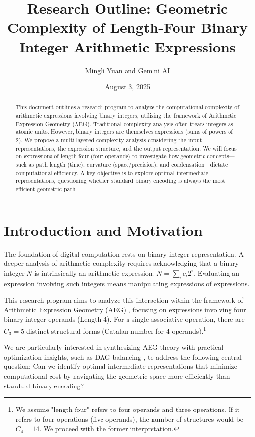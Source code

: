 \documentclass[11pt, a4paper]{article}
\title{Research Outline: Geometric Complexity of Length-Four Binary Integer Arithmetic Expressions}
\author{Mingli Yuan and Gemini AI}
\date{August 3, 2025}
\begin{document}
\maketitle

\begin{abstract}
This document outlines a research program to analyze the computational complexity of arithmetic expressions involving binary integers, utilizing the framework of Arithmetic Expression Geometry (AEG). Traditional complexity analysis often treats integers as atomic units. However, binary integers are themselves expressions (sums of powers of 2). We propose a multi-layered complexity analysis considering the input representations, the expression structure, and the output representation. We will focus on expressions of length four (four operands) to investigate how geometric concepts—such as path length (time), curvature (space/precision), and condensation—dictate computational efficiency. A key objective is to explore optimal intermediate representations, questioning whether standard binary encoding is always the most efficient geometric path.
\end{abstract}

\tableofcontents

\section{Introduction and Motivation}

The foundation of digital computation rests on binary integer representation. A deeper analysis of arithmetic complexity requires acknowledging that a binary integer $N$ is intrinsically an arithmetic expression: $N = \sum_{i} c_i 2^i$. Evaluating an expression involving such integers means manipulating expressions of expressions.

This research program aims to analyze this interaction within the framework of Arithmetic Expression Geometry (AEG) \cite{AEG-Draft}, focusing on expressions involving four binary integer operands (Length 4). For a single associative operation, there are $C_3 = 5$ distinct structural forms (Catalan number for 4 operands).\footnote{We assume "length four" refers to four operands and three operations. If it refers to four operations (five operands), the number of structures would be $C_4 = 14$. We proceed with the former interpretation.}

We are particularly interested in synthesizing AEG theory with practical optimization insights, such as DAG balancing \cite{Wilhelm2017}, to address the following central question: Can we identify optimal intermediate representations that minimize computational cost by navigating the geometric space more efficiently than standard binary encoding?
\end{document}
